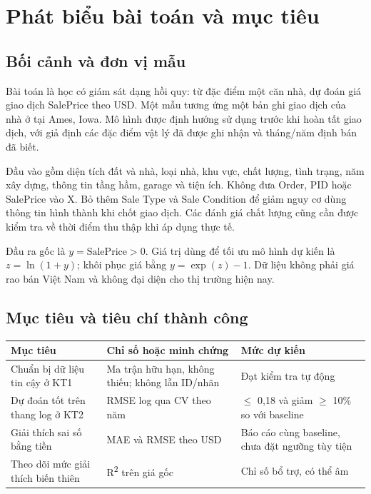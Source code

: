 \documentclass[12pt,a4paper]{article}
\begin{document}
\section{Phát biểu bài toán và mục tiêu}

\subsection{Bối cảnh và đơn vị mẫu}

Bài toán là học có giám sát dạng hồi quy: từ đặc điểm một căn nhà, dự đoán giá giao dịch SalePrice theo USD. Một mẫu tương ứng một bản ghi giao dịch của nhà ở tại Ames, Iowa. Mô hình được định hướng sử dụng trước khi hoàn tất giao dịch, với giả định các đặc điểm vật lý đã được ghi nhận và tháng/năm định bán đã biết.


Đầu vào gồm diện tích đất và nhà, loại nhà, khu vực, chất lượng, tình trạng, năm xây dựng, thông tin tầng hầm, garage và tiện ích. Không đưa Order, PID hoặc SalePrice vào X. Bỏ thêm Sale Type và Sale Condition để giảm nguy cơ dùng thông tin hình thành khi chốt giao dịch. Các đánh giá chất lượng cũng cần được kiểm tra về thời điểm thu thập khi áp dụng thực tế.


Đầu ra gốc là $y=\mathrm{SalePrice}>0$. Giá trị dùng để tối ưu mô hình
dự kiến là $z=\ln(1+y)$; khôi phục giá bằng $y=\exp(z)-1$.
Dữ liệu không phải giá rao bán Việt Nam và không đại diện cho thị trường hiện nay.

\subsection{Mục tiêu và tiêu chí thành công}

\begingroup\small\setlength{\tabcolsep}{5pt}
\begin{tabularx}{\linewidth}{@{}YYY@{}}\toprule

\textbf{Mục tiêu} & \textbf{Chỉ số hoặc minh chứng} & \textbf{Mức dự kiến}\\

\midrule

Chuẩn bị dữ liệu tin cậy ở KT1 & Ma trận hữu hạn, không thiếu; không lẫn ID/nhãn & Đạt kiểm tra tự động\\

Dự đoán tốt trên thang log ở KT2 & RMSE log qua CV theo năm & \ensuremath{\leq} 0,18 và giảm \ensuremath{\geq} 10\% so với baseline\\

Giải thích sai số bằng tiền & MAE và RMSE theo USD & Báo cáo cùng baseline, chưa đặt ngưỡng tùy tiện\\

Theo dõi mức giải thích biến thiên & R\textsuperscript{2} trên giá gốc & Chỉ số bổ trợ, có thể âm\\

\bottomrule\end{tabularx}\endgroup\par
\end{document}
